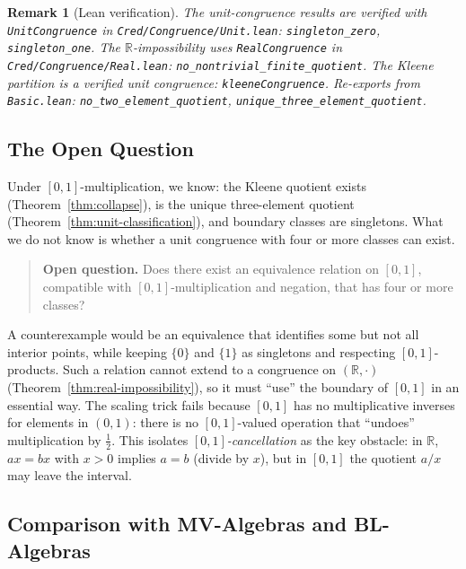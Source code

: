 \documentclass[11pt,a4paper]{article}
\newtheorem{remark}[theorem]{Remark}
\begin{document}
\begin{remark}[Lean verification]
\label{rem:lean-congruence}
The unit-congruence results are verified with \texttt{UnitCongruence}
in \texttt{Cred/Congruence/Unit.lean}:
\texttt{singleton\_zero}, \texttt{singleton\_one}.
The $\mathbb{R}$-impossibility uses \texttt{RealCongruence} in
\texttt{Cred/Congruence/Real.lean}:
\texttt{no\_nontrivial\_finite\_quotient}.
The Kleene partition is a verified unit congruence:
\texttt{kleeneCongruence}.
Re-exports from \texttt{Basic.lean}:
\texttt{no\_two\_element\_quotient},
\texttt{unique\_three\_element\_quotient}.
\end{remark}

\subsection{The Open Question}
\label{sec:open}

Under $[0,1]$-multiplication, we know:
the Kleene quotient exists (Theorem~\ref{thm:collapse}),
is the unique three-element quotient
(Theorem~\ref{thm:unit-classification}), and boundary classes are
singletons.
What we do not know is whether a unit congruence with four or more
classes can exist.

\begin{quote}
\textbf{Open question.}
Does there exist an equivalence relation on $[0,1]$, compatible with
$[0,1]$-multiplication and negation, that has four or more classes?
\end{quote}

A counterexample would be an equivalence that identifies some but not
all interior points, while keeping $\{0\}$ and $\{1\}$ as singletons
and respecting $[0,1]$-products.
Such a relation cannot extend to a congruence on
$(\mathbb{R}, \cdot)$ (Theorem~\ref{thm:real-impossibility}), so it
must ``use'' the boundary of $[0,1]$ in an essential way.
The scaling trick fails because $[0,1]$ has no multiplicative inverses
for elements in $(0,1)$: there is no $[0,1]$-valued operation that
``undoes'' multiplication by $\tfrac{1}{2}$.
This isolates \emph{$[0,1]$-cancellation} as the key obstacle:
in $\mathbb{R}$, $ax = bx$ with $x > 0$ implies $a = b$ (divide by
$x$), but in $[0,1]$ the quotient $a/x$ may leave the interval.

\subsection{Comparison with MV-Algebras and BL-Algebras}
\end{document}

